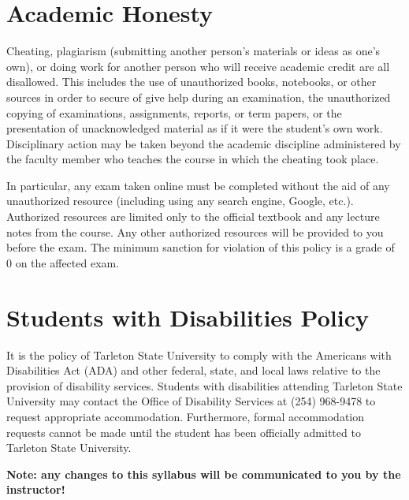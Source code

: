 \documentclass[10pt]{article}
\begin{document}
\section*{Academic Honesty}
\label{sec-8}
Cheating, plagiarism (submitting another person’s materials or ideas as 
one’s own), or doing work for another person who will receive academic 
credit are all disallowed. This includes the use of unauthorized books, 
notebooks, or other sources in order to secure of give help during an 
examination, the unauthorized copying of examinations, assignments, 
reports, or term papers, or the presentation of unacknowledged material 
as if it were the student’s own work. Disciplinary action may be taken 
beyond the academic discipline administered by the faculty member who 
teaches the course in which the cheating took place.

In particular, any exam taken online must be completed without the aid of 
any unauthorized resource (including using any search engine, Google,
etc.).  Authorized resources are limited only to the official textbook 
and any lecture notes from the course.  Any other authorized resources 
will be provided to you before the exam.  The minimum sanction for 
violation of this policy is a grade of 0 on the affected exam.

\section*{Students with Disabilities Policy}
\label{sec-9}
It is the policy of Tarleton State University to comply with the Americans
with Disabilities Act (ADA) and other federal, state, and local laws 
relative to the provision of disability services. Students with 
disabilities attending Tarleton State University may contact the Office 
of Disability Services at (254) 968-9478 to request appropriate 
accommodation. Furthermore, formal accommodation requests cannot be made 
until the student has been officially admitted to Tarleton State 
University.

\textbf{Note:  any changes to this syllabus will be communicated to you by the instructor!}
\end{document}
